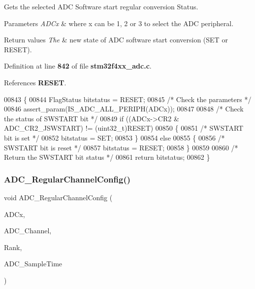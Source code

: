 Gets the selected A\+DC Software start regular conversion Status. 


\begin{DoxyParams}{Parameters}
{\em A\+D\+Cx} & where x can be 1, 2 or 3 to select the A\+DC peripheral. \\
\hline
\end{DoxyParams}

\begin{DoxyRetVals}{Return values}
{\em The} & new state of A\+DC software start conversion (S\+ET or R\+E\+S\+ET). \\
\hline
\end{DoxyRetVals}


Definition at line \textbf{ 842} of file \textbf{ stm32f4xx\+\_\+adc.\+c}.



References \textbf{ R\+E\+S\+ET}.


\begin{DoxyCode}
00843 \{
00844   FlagStatus bitstatus = RESET;
00845   \textcolor{comment}{/* Check the parameters */}
00846   assert_param(IS_ADC_ALL_PERIPH(ADCx));
00847   
00848   \textcolor{comment}{/* Check the status of SWSTART bit */}
00849   \textcolor{keywordflow}{if} ((ADCx->CR2 & ADC_CR2_JSWSTART) != (uint32\_t)RESET)
00850   \{
00851     \textcolor{comment}{/* SWSTART bit is set */}
00852     bitstatus = SET;
00853   \}
00854   \textcolor{keywordflow}{else}
00855   \{
00856     \textcolor{comment}{/* SWSTART bit is reset */}
00857     bitstatus = RESET;
00858   \}
00859   
00860   \textcolor{comment}{/* Return the SWSTART bit status */}
00861   \textcolor{keywordflow}{return}  bitstatus;
00862 \}
\end{DoxyCode}
\mbox{\label{group__ADC__Group4_gac531adb577b648d4bb8881f2ed627d52}} 
\subsubsection{A\+D\+C\+\_\+\+Regular\+Channel\+Config()}
{\footnotesize\ttfamily void A\+D\+C\+\_\+\+Regular\+Channel\+Config (\begin{DoxyParamCaption}\item[{\textbf{ A\+D\+C\+\_\+\+Type\+Def} $\ast$}]{A\+D\+Cx,  }\item[{uint8\+\_\+t}]{A\+D\+C\+\_\+\+Channel,  }\item[{uint8\+\_\+t}]{Rank,  }\item[{uint8\+\_\+t}]{A\+D\+C\+\_\+\+Sample\+Time }\end{DoxyParamCaption})}




